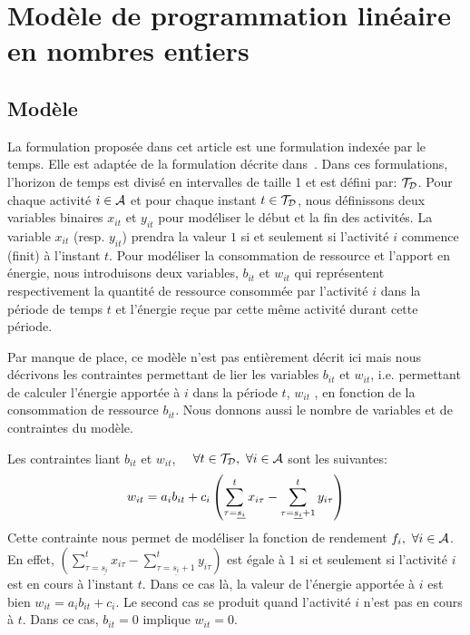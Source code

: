 \section{Modèle de programmation linéaire en nombres entiers}
\label{MIP}
\subsection{Modèle}
La formulation proposée dans cet article est une formulation indexée par
le temps. Elle est adaptée de la formulation décrite
dans~\cite{Nattaf2015}. 
Dans ces formulations, l'horizon de temps est divisé en
intervalles de taille 1 et est défini par: ${\cal T}_{\cal D}$. 
Pour chaque activité $i \in {\cal A}$ et pour chaque instant $t \in
{\cal T}_{\cal D}$, nous définissons deux variables binaires $x_{it}$
et $y_{it}$ pour modéliser le début et la fin des activités. La
variable $x_{it}$ (resp. $y_{it}$) prendra la valeur $1$ si et
seulement si l'activité $i$ commence (finit) à l'instant $t$.
Pour modéliser la consommation de ressource et l'apport en énergie,
nous introduisons deux variables, $b_{it}$ et $w_{it}$ qui
représentent respectivement la quantité de
ressource consommée par l'activité $i$ dans la période de temps
$t$ et l'énergie reçue par cette même activité durant cette période. 

Par manque de place, ce modèle n'est pas entièrement décrit ici mais
nous décrivons les contraintes permettant de lier les variables
$b_{it}$ et $w_{it}$, i.e. permettant de calculer l'énergie apportée à
$i$ dans la période $t$, $w_{it}$ , en fonction de la consommation de
ressource $b_{it}$. Nous donnons aussi le nombre de variables et de
contraintes du modèle.

Les contraintes liant $b_{it}$ et $w_{it}$, $\quad \forall t\in {\cal T}_{\cal D},\
\forall i \in {\cal A}$ sont les suivantes:
\begin{equation} \small w_{it}=a_ib_{it}+c_i\left(\sum_{\tau=\underline{s_i}}^t
x_{i\tau}-\sum_{\tau=\underline{s_i}+1}^t y_{i\tau}\right)  \label{conv_CECSP_TI}
\end{equation} Cette contrainte nous permet de modéliser la fonction
de rendement $f_i,\ \forall i \in {\cal A}$. En effet,
$\left(\sum_{\tau=\underline{s_i}}^t x_{i\tau}-\sum_{\tau=\underline{s_i}+1}^t
y_{i\tau}\right) $ est égale à $1$ si et seulement si l'activité $i$
est en cours à l'instant $t$.  Dans ce cas là, la valeur de l'énergie
apportée à $i$ est bien $w_{it}=a_ib_{it}+c_i$. Le second cas se
produit quand l'activité $i$ n'est pas en cours à $t$. Dans ce cas,
$b_{it}=0$ implique $w_{it}=0$.

